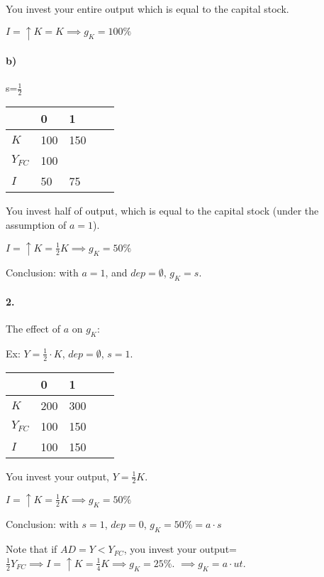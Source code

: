\documentclass{report}
\begin{document}
You invest your entire output which is equal to the capital stock. 

$I=\uparrow K=K \implies g_K=100\%$

\paragraph{b)} s=$\frac{1}{2}$

\begin{table}[H]
\centering
\begin{tabular}{|l|l|l|l|l|}
\hline
          & 0   & 1    \\ \hline
$K$       & 100 & 150   \\ \hline
$Y_{FC}$  & 100 &        \\ \hline
$I$       & 50  & 75      \\ \hline
\end{tabular}
\end{table}

You invest half of output, which is equal to the capital stock (under the assumption of $a=1$). 

$I=\uparrow K=\frac{1}{2}K \implies g_K=50\%$

Conclusion: with $a=1$, and $dep=\emptyset$, $g_K=s$. 

\paragraph{2.} The effect of $a$ on $g_K$: 

Ex: $Y=\frac{1}{2}\cdot K$, $dep=\emptyset$, $s=1$. 

\begin{table}[H]
\centering
\begin{tabular}{|l|l|l|l|l|}
\hline
          & 0   & 1    \\ \hline
$K$         & 200 & 300  \\ \hline
$Y_{FC}$ & 100 & 150  \\ \hline
$I$         & 100 & 150  \\ \hline
\end{tabular}
\end{table}

You invest your output, $Y=\frac{1}{2}K$. 

$I=\uparrow K=\frac{1}{2}K \implies g_K=50\%$

Conclusion: with $s=1$, $dep=0$, $g_K=50\%=a\cdot s$

Note that if $AD=Y<Y_{FC}$, you invest your output=$\frac{1}{2}Y_{FC} \implies I=\uparrow K=\frac{1}{4}K \implies g_K=25\%$. $\implies g_K=a\cdot ut$. 
\end{document}
